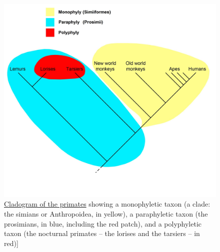 \begin{figure}

{\centering \includegraphics[width=0.7\linewidth]{./figures/systematics/Monophyly,_paraphyly,_polyphyly} 

}

\caption{\href{https://commons.wikimedia.org/wiki/File:Monophyly,_paraphyly,_polyphyly.png}{Cladogram of the primates} showing a monophyletic taxon (a clade: the simians or Anthropoidea, in yellow), a paraphyletic taxon (the prosimians, in blue, including the red patch), and a polyphyletic taxon (the nocturnal primates -- the lorises and the tarsiers -- in red){]}}\label{fig:cladogram}
\end{figure}


